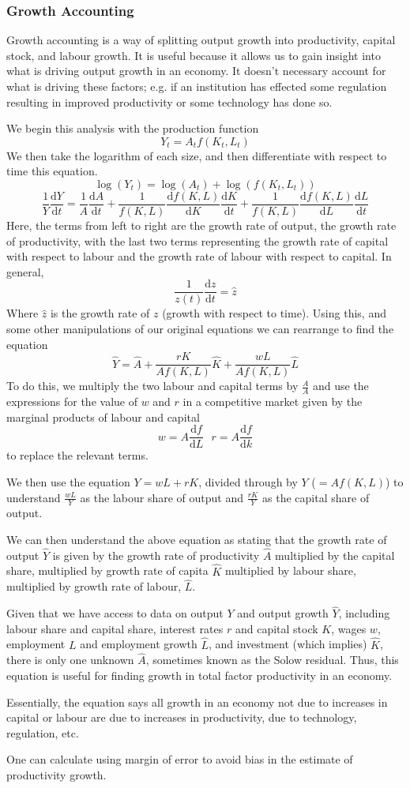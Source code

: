 \documentclass[12pt]{report}
\newcommand{\dd}[2]{\frac{\mathrm{d}#1}{\mathrm{d}#2}}
\begin{document}
\begin{flushleft}
\subsubsection*{Growth Accounting}

Growth accounting is a way of splitting output growth into productivity,
capital stock, and labour growth. It is useful because it allows us to gain
insight into what is driving output growth in an economy. It doesn't necessary
account for what is driving these factors; e.g. if an institution has effected
some regulation resulting in improved productivity or some technology has done
so. \par
We begin this analysis with the production function
\[Y_t = A_tf(K_t, L_t)\]
We then take the logarithm of each size, and then differentiate with respect to
time this equation.
\[\log(Y_t) = \log(A_t) + \log(f(K_t, L_t))\]
\[\frac{1}{Y}\dd{Y}{t} = \frac{1}{A}\dd{A}{t} 
+ \frac{1}{f(K, L)}\dd{f(K, L)}{K}\dd{K}{t} 
+ \frac{1}{f(K, L)}\dd{f(K, L)}{L}\dd{L}{t}\]
Here, the terms from left to right are the growth rate of output, the growth
rate of productivity, with the last two terms representing the growth rate of
capital with respect to labour and the growth rate of labour with respect to
capital. In general,
\[\frac{1}{z(t)} \dd{z}{t} = \hat{z}\]
Where \(\hat{z}\) is the growth rate of \(z\) (growth with respect to time).
Using this, and some other manipulations of our original equations we can
rearrange to find the equation
\[\hat{Y} = \hat{A} + \frac{rK}{Af(K, L)}\hat{K} + \frac{wL}{Af(K, L)}\hat{L}\]
To do this, we multiply the two labour and capital terms by \(\frac{A}{A}\) and
use the expressions for the value of \(w\) and \(r\) in a competitive market
given by the marginal products of labour and capital
\[w = A \dd{f}{L}\:\:\:r = A \dd{f}{k}\]
to replace the relevant terms.
\par
We then use the equation \(Y = wL + rK\), divided through by 
\(Y\) (\(= Af(K, L)\)) to
understand \(\frac{wL}{Y}\) as the labour share of output and \(\frac{rK}{Y}\)
as the capital share of output. \par
We can then understand the above equation as stating that the growth rate of
output \(\hat{Y}\) is given by the growth rate of productivity \(\hat{A}\)
multiplied by the capital share, multiplied by growth rate of capita
\(\hat{K}\) multiplied by labour share, multiplied by growth rate of labour,
\(\hat{L}\). \par
Given that we have access to data on output \(Y\) and output growth
\(\hat{Y}\), including labour share and capital share, interest rates \(r\)
and capital stock \(K\), wages \(w\), employment \(L\) and employment growth
\(\hat{L}\), and investment (which implies) \(\hat{K}\), there is only one
unknown \(\hat{A}\), sometimes known as the Solow residual. Thus, this equation
is useful for finding growth in total factor productivity in an economy. \par
Essentially, the equation says all growth in an economy not due to increases
in capital or labour are due to increases in productivity, due to technology,
regulation, etc. \par
One can calculate using margin of error to avoid bias in the estimate of
productivity growth.


\end{flushleft}
\end{document}
